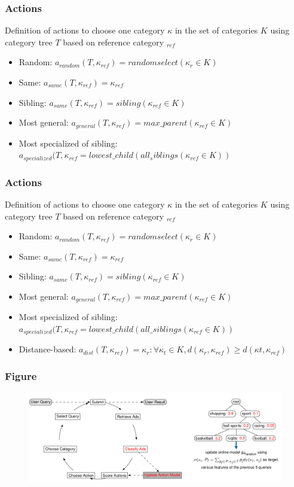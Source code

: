 \documentclass{beamer}
\begin{document}
\begin{frame}
	\frametitle{Actions}
	Definition of actions to choose one category $\kappa$ in the set of categories $K$ using
	category tree $T$ based on reference category $_{ref}$
	\begin{itemize} %
		\item Random: $a_{random} (T,\kappa_{ref}) = random select(\kappa_{r} \in K )$
		\item Same: $a_{same}(T,\kappa_{ref}) = \kappa_{ref}$
		\item Sibling: $a_{same}(T,\kappa_{ref}) = sibling(\kappa_{ref} \in K)$
		\item Most general: $a_{general}(T,\kappa_{ref}) = max\_parent(\kappa_{ref} \in K)$
		\item Most specialized of sibling: $a_{specialized} (T , \kappa_{ref} = lowest\_child(all_siblings(\kappa_{ref} \in K ))$
	\end{itemize}
\end{frame}

\begin{frame}
	\frametitle{Actions}
	Definition of actions to choose one category $\kappa$ in the set of categories $K$ using
	category tree $T$ based on reference category $_{ref}$
	\begin{itemize} %
		\item Random: $a_{random} (T,\kappa_{ref}) = random select(\kappa_{r} \in K )$
		\item Same: $a_{same}(T,\kappa_{ref}) = \kappa_{ref}$
		\item Sibling: $a_{same}(T,\kappa_{ref}) = sibling(\kappa_{ref} \in K)$
		\item Most general: $a_{general}(T,\kappa_{ref}) = max\_parent(\kappa_{ref} \in K)$
		\item Most specialized of sibling: $a_{specialized} (T , \kappa_{ref} = lowest\_child(all\_siblings(\kappa_{ref} \in K ))$
		\item Distance-based: $a_{dist} (T , \kappa_{ref} ) = \kappa_{r} : \forall \kappa_{t} \in K, d(\kappa_{r} , \kappa_{ref} ) \geq d(\kappa t , \kappa_{ref} )$
	\end{itemize}
\end{frame}


\begin{frame}
	\frametitle{Figure}
	\begin{figure}
	\includegraphics[width=0.8\linewidth]{circle-from-slides-edit.png}
	\end{figure}
\end{frame}
\end{document}
